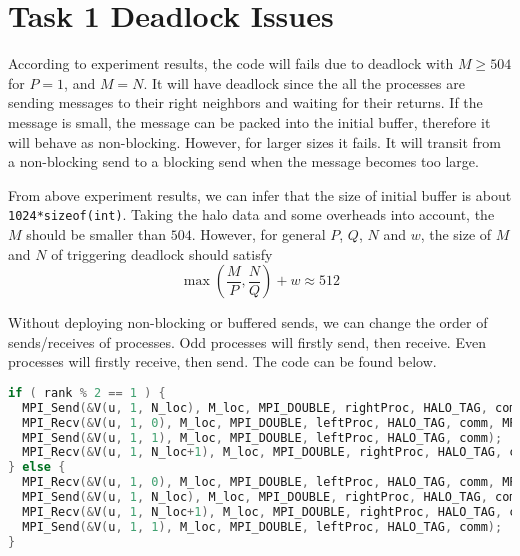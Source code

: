 \section{Task 1 Deadlock Issues}

According to experiment results, the code will fails due to deadlock with $M \geq 504$ for $P=1$, and $M=N$.
It will have deadlock since the all the processes are sending messages to their right neighbors and waiting for their returns.
If the message is small, the message can be packed into the initial buffer, therefore it will behave as non-blocking.
However, for larger sizes it fails. It will transit from a non-blocking send to a blocking send when the message becomes too large. 

From above experiment results, we can infer that the size of initial buffer is about \lstinline{1024*sizeof(int)}. Taking the halo data and some overheads into account, the $M$ should be smaller than $504$. However, for general $P$, $Q$, $N$ and $w$, the size of $M$ and $N$ of triggering deadlock should satisfy
\[
	\max{\left(\frac{M}{P}, \frac{N}{Q}\right)} + w \approx 512
\]

Without deploying non-blocking or buffered sends, we can change the order of sends/receives of processes. Odd processes will firstly send, then receive. Even processes will firstly receive, then send. The code can be found below.


\begin{lstlisting}[language=c] 
if ( rank % 2 == 1 ) {
  MPI_Send(&V(u, 1, N_loc), M_loc, MPI_DOUBLE, rightProc, HALO_TAG, comm);
  MPI_Recv(&V(u, 1, 0), M_loc, MPI_DOUBLE, leftProc, HALO_TAG, comm, MPI_STATUS_IGNORE);
  MPI_Send(&V(u, 1, 1), M_loc, MPI_DOUBLE, leftProc, HALO_TAG, comm);
  MPI_Recv(&V(u, 1, N_loc+1), M_loc, MPI_DOUBLE, rightProc, HALO_TAG, comm, MPI_STATUS_IGNORE);
} else {
  MPI_Recv(&V(u, 1, 0), M_loc, MPI_DOUBLE, leftProc, HALO_TAG, comm, MPI_STATUS_IGNORE);
  MPI_Send(&V(u, 1, N_loc), M_loc, MPI_DOUBLE, rightProc, HALO_TAG, comm);
  MPI_Recv(&V(u, 1, N_loc+1), M_loc, MPI_DOUBLE, rightProc, HALO_TAG, comm, MPI_STATUS_IGNORE);
  MPI_Send(&V(u, 1, 1), M_loc, MPI_DOUBLE, leftProc, HALO_TAG, comm);
}
\end{lstlisting}

